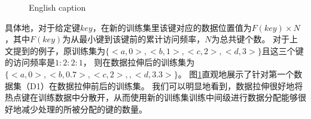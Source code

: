 
\begin{figure}[!htp]
  \centering
    {English caption}
  \label{fig:stretch-illus}
\end{figure}

具体地，对于给定键$key$，在新的训练集里该键对应的数据位置值为$F(key) \times N$，其中$F(key)$为从最小键到该键前的累计访问频率，$N$为总共键个数。
对于上文提到的例子，原训练集为$\{<a, 0>, <b, 1>, <c, 2>, <d, 3>\}$且这三个键的访问频率是$1:2:2:1$，
则在数据拉伸后的训练集为$\{<a, 0>, <b, 0.7>, <c, 2>, , <d, 3.3>\}$。
图\ref{fig:stretch-illus}直观地展示了针对第一个数据集（D1）在数据拉伸前后的训练集。
我们可以明显地看到，数据拉伸很好地将热点键在训练数据中分散开，从而使用新的训练集训练中间级{\model}进行数据分配能够很好地减少处理{\hotkey}的{\model}所被分配的键的数量。


